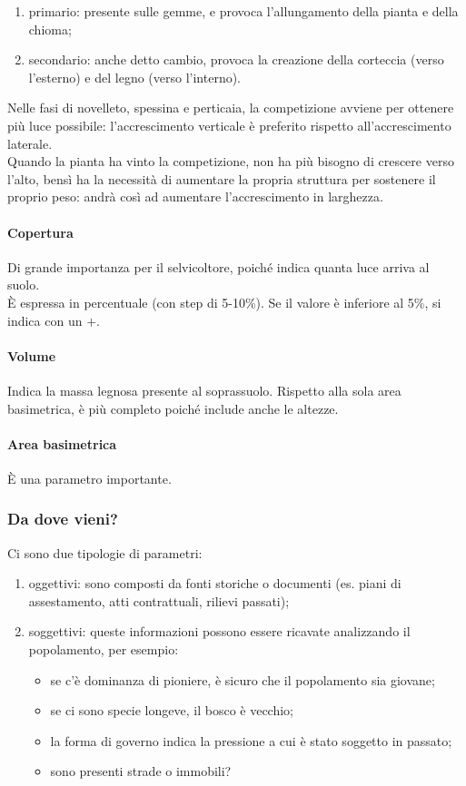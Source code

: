 \begin{enumerate}[nosep]
    \item primario: presente sulle gemme, e provoca l'allungamento della pianta e della chioma;
    \item secondario: anche detto cambio, provoca la creazione della corteccia (verso l'esterno) e del legno (verso l'interno).
\end{enumerate}
Nelle fasi di novelleto, spessina e perticaia, la competizione avviene per ottenere più luce possibile: l'accrescimento verticale è preferito rispetto all'accrescimento laterale.\\
Quando la pianta ha vinto la competizione, non ha più bisogno di crescere verso l'alto, bensì ha la necessità di aumentare la propria struttura per sostenere il proprio peso: andrà così ad aumentare l'accrescimento in larghezza.
\paragraph{Copertura}
Di grande importanza per il selvicoltore, poiché indica quanta luce arriva al suolo.\\
È espressa in percentuale (con step di 5-10\%). Se il valore è inferiore al 5\%, si indica con un $+$.
\paragraph{Volume}
Indica la massa legnosa presente al soprassuolo. Rispetto alla sola area basimetrica, è più completo poiché include anche le altezze.
\paragraph{Area basimetrica}
È una parametro importante.
\subsubsection{Da dove vieni?}
Ci sono due tipologie di parametri:
\begin{enumerate}[nosep]
    \item oggettivi: sono composti da fonti storiche o documenti (es. piani di assestamento, atti contrattuali, rilievi passati);
    \item soggettivi: queste informazioni possono essere ricavate analizzando il popolamento, per esempio:
    \begin{itemize}[nosep]
        \item se c'è dominanza di pioniere, è sicuro che il popolamento sia giovane;
        \item se ci sono specie longeve, il bosco è vecchio;
        \item la forma di governo indica la pressione a cui è stato soggetto in passato;
        \item sono presenti strade o immobili?
    \end{itemize}
\end{enumerate}
